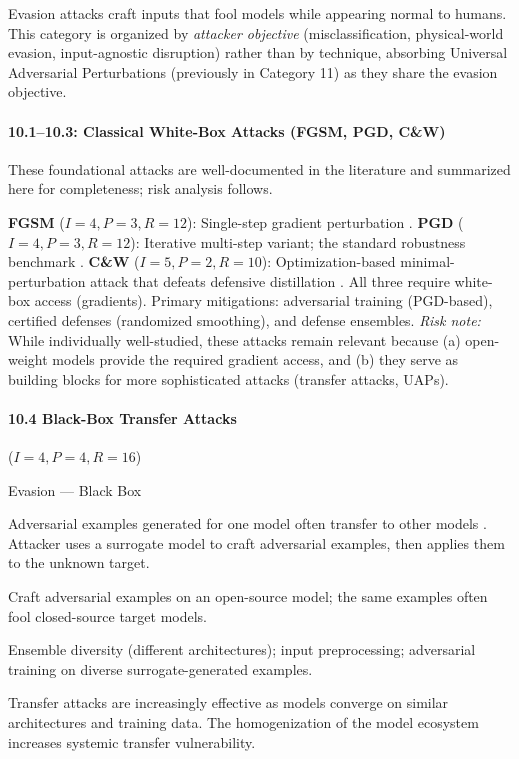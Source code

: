 \documentclass[conference]{IEEEtran}
\newenvironment{attackentry}{\begin{description}[style=unboxed,leftmargin=0cm,itemsep=1pt,parsep=1pt,topsep=2pt,font=\sffamily\small\color{accentdark}]}{\end{description}}
\begin{document}
Evasion attacks craft inputs that fool models while appearing normal to humans. This category is organized by \emph{attacker objective} (misclassification, physical-world evasion, input-agnostic disruption) rather than by technique, absorbing Universal Adversarial Perturbations (previously in Category 11) as they share the evasion objective.

\paragraph{10.1--10.3: Classical White-Box Attacks (FGSM, PGD, C\&W)} These foundational attacks are well-documented in the literature and summarized here for completeness; risk analysis follows.

\textbf{FGSM} ($I{=}4, P{=}3, R{=}12$): Single-step gradient perturbation \cite{goodfellow2014}. \textbf{PGD} ($I{=}4, P{=}3, R{=}12$): Iterative multi-step variant; the standard robustness benchmark \cite{madry2018}. \textbf{C\&W} ($I{=}5, P{=}2, R{=}10$): Optimization-based minimal-perturbation attack that defeats defensive distillation \cite{carlini2017}. All three require white-box access (gradients). Primary mitigations: adversarial training (PGD-based), certified defenses (randomized smoothing), and defense ensembles. \textit{Risk note:} While individually well-studied, these attacks remain relevant because (a) open-weight models provide the required gradient access, and (b) they serve as building blocks for more sophisticated attacks (transfer attacks, UAPs).

\paragraph{10.4 Black-Box Transfer Attacks} ($I{=}4, P{=}4, R{=}16$)
\begin{attackentry}
\item[Category:] Evasion --- Black Box
\item[How it works:] Adversarial examples generated for one model often transfer to other models \cite{papernot2016}. Attacker uses a surrogate model to craft adversarial examples, then applies them to the unknown target.
\item[Example:] Craft adversarial examples on an open-source model; the same examples often fool closed-source target models.
\item[Mitigations:] Ensemble diversity (different architectures); input preprocessing; adversarial training on diverse surrogate-generated examples.
\item[Novel Inference (Reported):] Transfer attacks are increasingly effective as models converge on similar architectures and training data. The homogenization of the model ecosystem increases systemic transfer vulnerability.
\end{attackentry}
\end{document}

